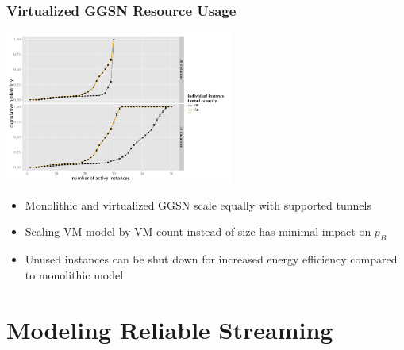 \documentclass{beamer}
\begin{document}





\begin{frame}
	\frametitle{Virtualized GGSN Resource Usage}

	\begin{center}
		\includegraphics[height=5cm]{../../chapters/041-mobilenetsmeasuring/images/R-virtualized-instanceuse.pdf}
	\end{center}

	\begin{itemize}
		\item Monolithic and virtualized GGSN scale equally with supported tunnels
		\item Scaling VM model by VM count instead of size has minimal impact on $p_B$
		\item Unused instances can be shut down for increased energy efficiency compared to monolithic model
	\end{itemize}
\end{frame}





\section{Modeling Reliable Streaming}
\end{document}
